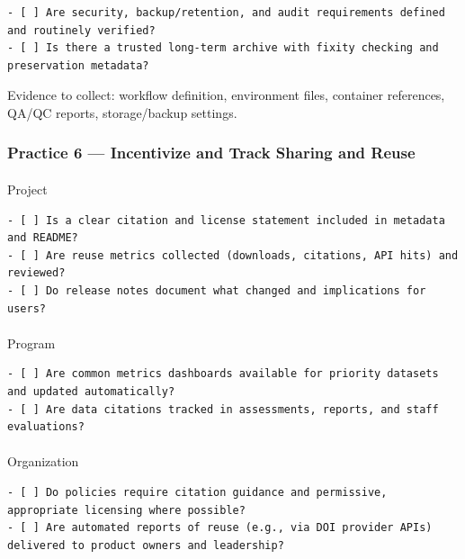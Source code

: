 \documentclass[
  letterpaper,
  DIV=11,
  numbers=noendperiod]{scrartcl}
\makeatletter
\let\oldparagraph\paragraph
\renewcommand{\paragraph}{
    \@ifstar
      \xxxParagraphStar
      \xxxParagraphNoStar
  }
\newcommand{\xxxParagraphStar}[1]{\oldparagraph*{#1}\mbox{}}
\newcommand{\xxxParagraphNoStar}[1]{\oldparagraph{#1}\mbox{}}
\makeatother
\begin{document}
\begin{verbatim}
- [ ] Are security, backup/retention, and audit requirements defined and routinely verified?
- [ ] Is there a trusted long‑term archive with fixity checking and preservation metadata?
\end{verbatim}

Evidence to collect: workflow definition, environment files, container
references, QA/QC reports, storage/backup settings.

\subsubsection{Practice 6 --- Incentivize and Track Sharing and
Reuse}\label{practice-6-incentivize-and-track-sharing-and-reuse}

\paragraph{Project}\label{project-5}

\begin{verbatim}
- [ ] Is a clear citation and license statement included in metadata and README?
- [ ] Are reuse metrics collected (downloads, citations, API hits) and reviewed?
- [ ] Do release notes document what changed and implications for users?
\end{verbatim}

\paragraph{Program}\label{program-5}

\begin{verbatim}
- [ ] Are common metrics dashboards available for priority datasets and updated automatically?
- [ ] Are data citations tracked in assessments, reports, and staff evaluations?
\end{verbatim}

\paragraph{Organization}\label{organization-5}

\begin{verbatim}
- [ ] Do policies require citation guidance and permissive, appropriate licensing where possible?
- [ ] Are automated reports of reuse (e.g., via DOI provider APIs) delivered to product owners and leadership?
\end{verbatim}
\end{document}

